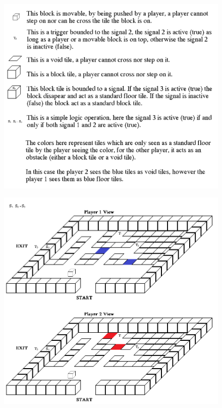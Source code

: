\documentclass[12pt]{article}
\begin{document}
		\begin{figure}[h]
		\includegraphics[scale = 0.5]{PEnuts_Concept_legend.png}
		\centering
		\end{figure}
		\begin{figure}[h]
		\includegraphics[scale = 0.55]{PEnuts_Concept_view.png}
		\centering
		\end{figure}
        
\end{document}
